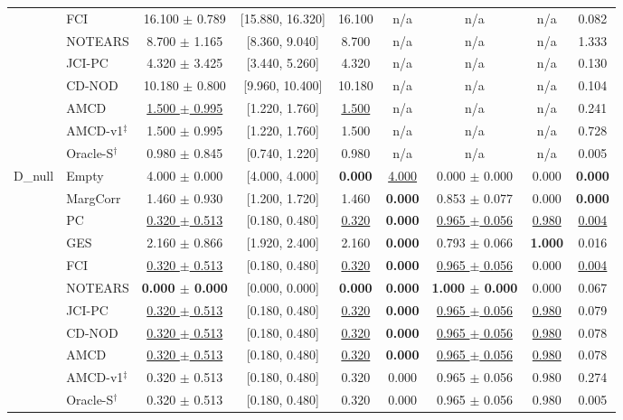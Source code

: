 \begin{tabular}{llccccccc}
 & FCI & 16.100 $\pm$ 0.789 & [15.880, 16.320] & 16.100 & n/a & n/a & n/a & 0.082 \\
 & NOTEARS & 8.700 $\pm$ 1.165 & [8.360, 9.040] & 8.700 & n/a & n/a & n/a & 1.333 \\
 & JCI-PC & 4.320 $\pm$ 3.425 & [3.440, 5.260] & 4.320 & n/a & n/a & n/a & 0.130 \\
 & CD-NOD & 10.180 $\pm$ 0.800 & [9.960, 10.400] & 10.180 & n/a & n/a & n/a & 0.104 \\
 & AMCD & \underline{1.500 $\pm$ 0.995} & [1.220, 1.760] & \underline{1.500} & n/a & n/a & n/a & 0.241 \\
 & AMCD-v1$^\ddagger$ & 1.500 $\pm$ 0.995 & [1.220, 1.760] & 1.500 & n/a & n/a & n/a & 0.728 \\
 & Oracle-S$^\dagger$ & 0.980 $\pm$ 0.845 & [0.740, 1.220] & 0.980 & n/a & n/a & n/a & 0.005 \\
D\_null & Empty & 4.000 $\pm$ 0.000 & [4.000, 4.000] & \textbf{0.000} & \underline{4.000} & 0.000 $\pm$ 0.000 & 0.000 & \textbf{0.000} \\
 & MargCorr & 1.460 $\pm$ 0.930 & [1.200, 1.720] & 1.460 & \textbf{0.000} & 0.853 $\pm$ 0.077 & 0.000 & \textbf{0.000} \\
 & PC & \underline{0.320 $\pm$ 0.513} & [0.180, 0.480] & \underline{0.320} & \textbf{0.000} & \underline{0.965 $\pm$ 0.056} & \underline{0.980} & \underline{0.004} \\
 & GES & 2.160 $\pm$ 0.866 & [1.920, 2.400] & 2.160 & \textbf{0.000} & 0.793 $\pm$ 0.066 & \textbf{1.000} & 0.016 \\
 & FCI & \underline{0.320 $\pm$ 0.513} & [0.180, 0.480] & \underline{0.320} & \textbf{0.000} & \underline{0.965 $\pm$ 0.056} & 0.000 & \underline{0.004} \\
 & NOTEARS & \textbf{0.000 $\pm$ 0.000} & [0.000, 0.000] & \textbf{0.000} & \textbf{0.000} & \textbf{1.000 $\pm$ 0.000} & 0.000 & 0.067 \\
 & JCI-PC & \underline{0.320 $\pm$ 0.513} & [0.180, 0.480] & \underline{0.320} & \textbf{0.000} & \underline{0.965 $\pm$ 0.056} & \underline{0.980} & 0.079 \\
 & CD-NOD & \underline{0.320 $\pm$ 0.513} & [0.180, 0.480] & \underline{0.320} & \textbf{0.000} & \underline{0.965 $\pm$ 0.056} & \underline{0.980} & 0.078 \\
 & AMCD & \underline{0.320 $\pm$ 0.513} & [0.180, 0.480] & \underline{0.320} & \textbf{0.000} & \underline{0.965 $\pm$ 0.056} & \underline{0.980} & 0.078 \\
 & AMCD-v1$^\ddagger$ & 0.320 $\pm$ 0.513 & [0.180, 0.480] & 0.320 & 0.000 & 0.965 $\pm$ 0.056 & 0.980 & 0.274 \\
 & Oracle-S$^\dagger$ & 0.320 $\pm$ 0.513 & [0.180, 0.480] & 0.320 & 0.000 & 0.965 $\pm$ 0.056 & 0.980 & 0.005 \\
\bottomrule
\end{tabular}
